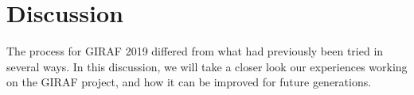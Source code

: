 \chapter{Discussion}
The process for GIRAF 2019 differed from what had previously been tried in several ways.
In this discussion, we will take a closer look our experiences working on the GIRAF project, and how it can be improved for future generations.




